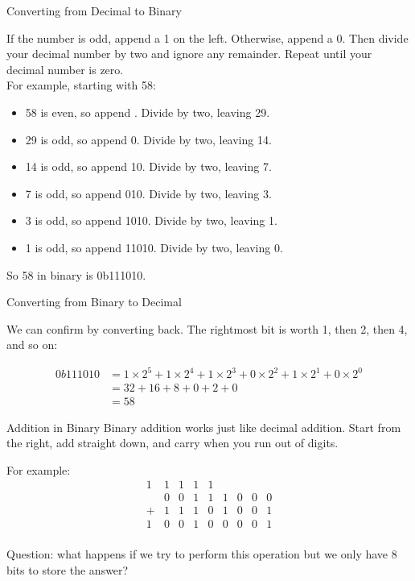\begin{frame}{Converting from Decimal to Binary}

If the number is odd, append a 1 on the left. Otherwise, append a 0. Then divide your decimal number by two and ignore any remainder. Repeat until your decimal number is zero. \\

For example, starting with 58:

\begin{itemize}
\item 58 is even, so append . Divide by two, leaving 29.
\item 29 is odd, so append 0. Divide by two, leaving 14. 
\item 14 is odd, so append 10. Divide by two, leaving 7.
\item 7 is odd, so append 010. Divide by two, leaving 3.
\item 3 is odd, so append 1010. Divide by two, leaving 1.
\item 1 is odd, so append 11010. Divide by two, leaving 0.
\end{itemize}

So 58 in binary is 0b111010.

\end{frame}

\begin{frame}{Converting from Binary to Decimal}

We can confirm by converting back. The rightmost bit is worth 1, then 2, then 4, and so on:

\begin{align*}
    0b111010 &= 
1 \! \times \! 2^5 +
1 \! \times \! 2^4 +
1 \! \times \! 2^3 +
0 \! \times \! 2^2 +
1 \! \times \! 2^1 +
0 \! \times \! 2^0 \\
 &= 32 + 16  + 8 + 0 + 2 + 0\\
 &= 58
\end{align*}

\end{frame}

\begin{frame}{Addition in Binary}
Binary addition works just like decimal addition. 
Start from the right, add straight down, and carry when you run out of digits.

For example:
\[
\begin{array}{ccccccccc}
    1 & 1 & 1 & 1 & 1 &   &   &   &   \\ 
      & 0 & 0 & 1 & 1 & 1 & 0 & 0 & 0 \\ 
    + & 1 & 1 & 1 & 0 & 1 & 0 & 0 & 1 \\
    \hline
    1 & 0 & 0 & 1 & 0 & 0 & 0 & 0 & 1 \\ 
\end{array}
\]

Question: what happens if we try to perform this operation but we only have 8 bits to store the answer? 
\end{frame}

